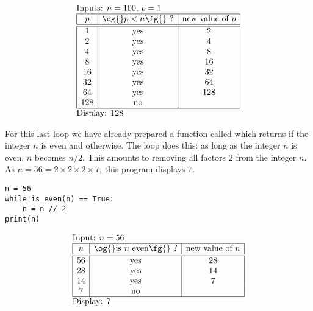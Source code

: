 \documentclass[11pt,class=report,crop=false]{standalone}
\begin{document}
\begin{cours}
\begin{exemple}
  $$
  \begin{array}{l}
  \text{Inputs: $n=100$, $p=1$}    \\
  \begin{array}{|c|c|c|}
  \hline  
  p & \text{\og{}$p < n$\fg{} ?} & \text{new value of } p \\
  \hline\hline 
  1 & \text{yes} & 2 \\
  2 & \text{yes} & 4 \\
  4 & \text{yes} & 8 \\
  8 & \text{yes} & 16 \\  
  16 & \text{yes} & 32 \\
  32 & \text{yes} & 64 \\ 
  64 & \text{yes} & 128 \\   
  128 & \text{no} &  \\     
  \hline
  \end{array} \\
  \text{Display: $128$}  
  \end{array} 
  $$ 
  
\end{exemple}

\bigskip

\begin{exemple}
\begin{minipage}{0.55\textwidth}
For this last loop we have already prepared a function called  which returns  if the integer $n$ is even and  otherwise. The loop does this: as long as the integer $n$ is even, $n$ becomes $n/2$. This amounts to removing all factors $2$ from the integer $n$. As $n = 56 = 2\times 2 \times 2 \times 7$, this program displays $7$.
\end{minipage}\qquad\quad
\begin{minipage}{0.4\textwidth}
\begin{lstlisting}
n = 56
while is_even(n) == True:
    n = n // 2
print(n)
\end{lstlisting}

\end{minipage}

\smallskip

  $$
  \begin{array}{l}
  \text{Input: $n=56$}    \\
  \begin{array}{|c|c|c|}
  \hline  
  n & \text{\og{}is $n$ even\fg{} ?} & \text{new value of } n \\
  \hline\hline 
  56 & \text{yes} & 28 \\
  28 & \text{yes} & 14 \\
  14 & \text{yes} & 7 \\
  7 & \text{no} &  \\ 
  \hline
  \end{array} \\
  \text{Display: $7$}  
  \end{array} 
  $$ 
\medskip


\end{exemple}
\end{cours}
\end{document}
